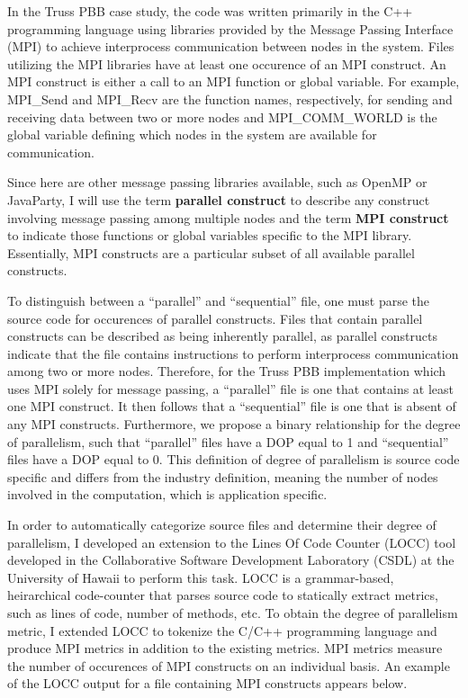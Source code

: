 In the Truss PBB case study, the code was written primarily in the C++
programming language using libraries provided by the Message Passing
Interface\cite{MPISite} (MPI) to achieve interprocess communication
between nodes in the system.  Files utilizing the MPI libraries have
at least one occurence of an MPI construct.  An MPI construct is
either a call to an MPI function or global variable.  For example,
MPI\_Send and MPI\_Recv are the function names, respectively, for
sending and receiving data between two or more nodes and
MPI\_COMM\_WORLD is the global variable defining which nodes in the
system are available for communication.  

Since here are other message passing libraries available, such as
OpenMP\cite{OpenMPSite} or JavaParty\cite{JavaPartySite}, I will use
the term {\bf parallel construct} to describe any construct involving
message passing among multiple nodes and the term {\bf MPI construct}
to indicate those functions or global variables specific to the MPI
library.  Essentially, MPI constructs are a particular subset of all
available parallel constructs.

To distinguish between a ``parallel'' and ``sequential'' file, one
must parse the source code for occurences of parallel constructs.
Files that contain parallel constructs can be described as being
inherently parallel, as parallel constructs indicate that the file
contains instructions to perform interprocess communication among two
or more nodes.  Therefore, for the Truss PBB implementation which uses
MPI solely for message passing, a ``parallel'' file is one that
contains at least one MPI construct.  It then follows that a
``sequential'' file is one that is absent of any MPI constructs.
Furthermore, we propose a binary relationship for the degree of
parallelism, such that ``parallel'' files have a DOP equal to 1 and
``sequential'' files have a DOP equal to 0.  This definition of degree
of parallelism is source code specific and differs from the industry
definition, meaning the number of nodes involved in the computation,
which is application specific.

In order to automatically categorize source files and determine their
degree of parallelism, I developed an extension to the Lines Of Code
Counter (LOCC) tool developed in the Collaborative Software
Development Laboratory (CSDL) at the University of Hawaii to perform
this task.  LOCC is a grammar-based, heirarchical code-counter that
parses source code to statically extract metrics, such as lines of
code, number of methods, etc.  To obtain the degree of parallelism
metric, I extended LOCC to tokenize the C/C++ programming language and
produce MPI metrics in addition to the existing metrics.  MPI metrics
measure the number of occurences of MPI constructs on an individual
basis.  An example of the LOCC output for a file containing MPI
constructs appears below.

